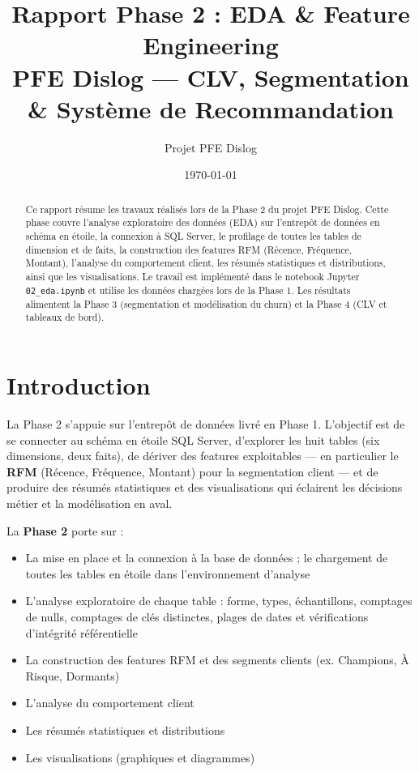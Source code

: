 \documentclass[11pt,a4paper]{article}
\title{\textbf{Rapport Phase 2 : EDA \& Feature Engineering}\\PFE Dislog --- CLV, Segmentation \& Système de Recommandation}
\author{Projet PFE Dislog}
\date{\today}
\begin{document}
\maketitle

\begin{abstract}
Ce rapport résume les travaux réalisés lors de la Phase 2 du projet PFE Dislog. Cette phase couvre l'analyse exploratoire des données (EDA) sur l'entrepôt de données en schéma en étoile, la connexion à SQL Server, le profilage de toutes les tables de dimension et de faits, la construction des features RFM (Récence, Fréquence, Montant), l'analyse du comportement client, les résumés statistiques et distributions, ainsi que les visualisations. Le travail est implémenté dans le notebook Jupyter \texttt{02\_eda.ipynb} et utilise les données chargées lors de la Phase 1. Les résultats alimentent la Phase 3 (segmentation et modélisation du churn) et la Phase 4 (CLV et tableaux de bord).
\end{abstract}

\tableofcontents
\newpage

\section{Introduction}

La Phase 2 s'appuie sur l'entrepôt de données livré en Phase 1. L'objectif est de se connecter au schéma en étoile SQL Server, d'explorer les huit tables (six dimensions, deux faits), de dériver des features exploitables --- en particulier le \textbf{RFM} (Récence, Fréquence, Montant) pour la segmentation client --- et de produire des résumés statistiques et des visualisations qui éclairent les décisions métier et la modélisation en aval.

La \textbf{Phase 2} porte sur :
\begin{itemize}[noitemsep]
  \item La mise en place et la connexion à la base de données ; le chargement de toutes les tables en étoile dans l'environnement d'analyse
  \item L'analyse exploratoire de chaque table : forme, types, échantillons, comptages de nulls, comptages de clés distinctes, plages de dates et vérifications d'intégrité référentielle
  \item La construction des features RFM et des segments clients (ex. Champions, À Risque, Dormants)
  \item L'analyse du comportement client
  \item Les résumés statistiques et distributions
  \item Les visualisations (graphiques et diagrammes)
\end{itemize}
\end{document}
